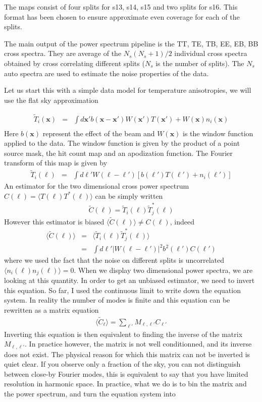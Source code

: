 \documentclass[a4paper, 11pt]{article}
\def\ba{\begin{eqnarray}}
\def\ea{\end{eqnarray}}
\begin{document}
The maps consist of four splits for s13, s14, s15 and two splits for s16. This format has been chosen to ensure  approximate even coverage for each of the splits. 

The main output of the power spectrum pipeline is  the TT, TE, TB, EE, EB, BB cross spectra. They are average of the $N_{s}(N_{s}+1)/2$ individual cross spectra obtained by cross correlating different splits  ($N_{s}$ is the number of splits). The $N_{s}$ auto spectra are  used to estimate the noise properties of the data. 

Let us start this with a simple data model for temperature anisotropies, we will use the flat sky approximation

\ba
\tilde{T}_{i}(\bm{x}) &=& \int d\bm{x'} b( \bm{x}-\bm{x'}) W(\bm{x'}) T(\bm{x'})+W( \bm{x}) n_{i} (\bm{x})  \\
\ea
Here $b( \bm{x})$ represent the effect of the beam and $W( \bm{x})$ is the window function applied to the data. The window function is given by the product of a point source mask, the hit count map and an apodization function. The Fourier transform of this map is given by
\ba
\tilde{T}_{i}(\bm{\ell}) &=& \int d\bm{\ell'} W (\bm{\ell}-\bm{\ell'}) \left[ b(\bm{\ell'}) T(\bm{\ell'}) + n_{i}(\bm{\ell'})\right] \label{eq:Tfourier}
\ea
An estimator for the two dimensional cross power spectrum $C(\bm{\ell})=\langle T(\bm{\ell}) T^{*}(\bm{\ell}) \rangle $ can be simply written  
\ba
\tilde{C}(\bm{\ell})= \tilde{T}_{i}(\bm{\ell}) \tilde{T}^{*}_{j}(\bm{\ell})
\ea
However this estimator is biased $\langle \tilde{C}(\bm{\ell}) \rangle \neq C(\bm{\ell})$, indeed
\ba
\langle \tilde{C}(\bm{\ell}) \rangle &=& \langle  \tilde{T}_{i}(\bm{\ell}) \tilde{T}^{*}_{j}(\bm{\ell}) \rangle \\
&=& \int d\bm{\ell'} | W (\bm{\ell}-\bm{\ell'})|^{2}b^{2}(\bm{\ell'})  C(\bm{\ell'})
\ea
where we used the fact that the noise on different splits is uncorrelated $ \langle n_{i}(\bm{\ell}) n_{j}(\bm{\ell}) \rangle=0$. When we display two dimensional power spectra, we are looking at this quantity. In order to get an unbiased estimator, we need to invert this equation. So far, I used the continuous limit to write down the equation system. In reality the number of modes is finite and this equation can be rewritten as a matrix equation
\ba
\langle \tilde{C}_{\bm{\ell}} \rangle= \sum_{\bm{\ell}'} M_{\bm{\ell}, \bm{\ell'}}  C_{\bm{\ell'}}
\ea 
Inverting this equation is then equivalent to finding the inverse of the matrix $ M_{\bm{\ell}, \bm{\ell'}} $. In practice however, the matrix is not well conditionned, and its inverse does not exist. The physical reason for which this matrix can not be inverted is quiet clear. If you observe only a fraction of the sky, you can not distinguish between close-by Fourier modes, this is equivalent to say that you have limited resolution in harmonic space. In practice, what we do is to bin the matrix and the power spectrum, and turn the equation system into
\end{document}
